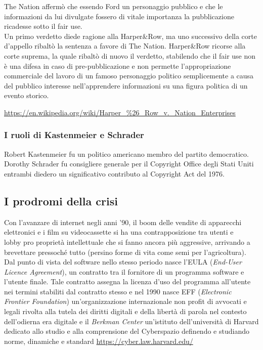 The Nation affermò che essendo Ford un personaggio pubblico e che le informazioni da lui divulgate fossero di vitale importanza la pubblicazione ricadesse sotto il fair use.\\

Un primo verdetto diede ragione alla Harper\&Row, ma uno successivo
della corte d'appello ribaltò la sentenza a favore di The Nation. Harper\&Row ricorse alla corte suprema, la quale ribaltò di nuovo il
verdetto, stabilendo che il fair use non è una difesa in caso di  
pre-pubblicazione e non permette l'appropriazione commerciale del 
lavoro di un famoso personaggio politico semplicemente 
a causa del pubblico interesse nell'apprendere informazioni su una
figura politica di un evento storico.\\

\begin{sloppypar}
\url{https://en.wikipedia.org/wiki/Harper_%26_Row_v._Nation_Enterprises}
\end{sloppypar}

\subsubsection{I ruoli di Kastenmeier e Schrader}

Robert Kastenmeier fu un politico americano membro del partito democratico. 
Dorothy Schrader fu consigliere generale per il Copyright Office degli Stati Uniti entrambi diedero un significativo contributo al Copyright Act del 1976.

\subsection{I prodromi della crisi}

Con l'avanzare di internet negli anni '90, il boom delle vendite di apparecchi elettronici e i film su videocassette si ha una contrapposizione tra utenti e \\lobby pro proprietà intellettuale che si fanno ancora più aggressive, arrivando a brevettare pressoché tutto (persino forme di vita come semi per l'agricoltura).\\

Dal punto di vista del software nello stesso periodo nasce l'EULA (\textit{End-User Licence Agreement}), un contratto tra il fornitore di un programma software e l'utente finale. Tale contratto assegna la licenza d'uso del programma all'utente nei termini stabiliti dal contratto stesso e nel 1990 nasce EFF (\textit{Electronic Frontier Foundation}) un'organizzazione internazionale non profit di avvocati e legali rivolta alla tutela dei diritti digitali e della libertà di parola nel contesto dell'odierna era digitale e il \textit{Berkman Center} un'istituto dell'università di Harvard dedicato allo studio e alla comprensione del Cyberspazio definendo e studiando norme, dinamiche e standard \url{https://cyber.law.harvard.edu/}\\

